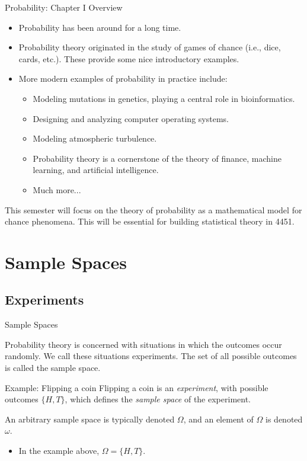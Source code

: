 \begin{frame}[allowframebreaks]{Probability: Chapter I Overview}

\begin{itemize}

\item Probability has been around for a long time.
\item Probability theory originated in the study of games of chance (i.e., dice, cards, etc.). These provide some nice introductory examples. 
\item More modern examples of probability in practice include: 
\begin{itemize}
  \item Modeling mutations in genetics, playing a central role in bioinformatics.
  \item Designing and analyzing computer operating systems.
  \item Modeling atmospheric turbulence. 
  \item Probability theory is a cornerstone of the theory of finance, machine learning, and artificial intelligence.
  \item Much more...
\end{itemize}
\end{itemize}

\framebreak

This semester will focus on the theory of probability as a mathematical model for chance phenomena. This will be essential for building statistical theory in 4451.

\end{frame}

\section{Sample Spaces}

\subsection{Experiments}

\begin{frame}{Sample Spaces}

Probability theory is concerned with situations in which the outcomes occur randomly.
We call these situations \alert{experiments}. 
The set of all possible outcomes is called the \alert{sample space}. 

\begin{exampleblock}{Example: Flipping a coin}
  Flipping a coin is an \emph{experiment}, with possible outcomes $\{H, T\}$, which defines the \emph{sample space} of the experiment.
\end{exampleblock}

An arbitrary sample space is typically denoted $\Omega$, and an element of $\Omega$ is denoted $\omega$.

\pause 

\begin{itemize}
  \item In the example above, $\Omega = \{H, T\}$. 
\end{itemize}

\end{frame}

